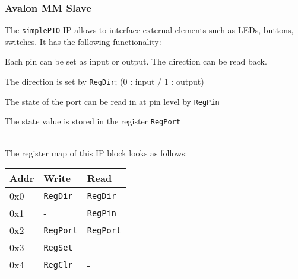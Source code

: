 		
		\subsubsection{Avalon MM Slave }
			The \texttt{simplePIO}-IP allows to interface external elements such as LEDs, buttons, switches. It has the following functionality:
			\begin{compactitem}
				\item Each pin can be set as input or output. The direction can be read back.
				\item The direction is set by \texttt{RegDir}; (0 : input / 1 : output)
				\item The state of the port can be read in at pin level by \texttt{RegPin}
				\item The state value is stored in the register \texttt{RegPort}
			\end{compactitem} \ \\
		
			The register map of this IP block looks as follows: \\
			\begin{tabular}{|p{0.1\textwidth}|p{}|p{}|}
				\hline
				\textbf{Addr} & \textbf{Write} & \textbf{Read} \\
				\hline
				0x0 & \texttt{RegDir} & \texttt{RegDir} \\ \hline
				0x1 & - & \texttt{RegPin} \\ \hline
				0x2 & \texttt{RegPort} & \texttt{RegPort} \\ \hline
				0x3 & \texttt{RegSet} & - \\ \hline
				0x4 & \texttt{RegClr} & - \\ \hline
			\end{tabular}
			\begin{multicols}{2}		
				
			\end{multicols}			
			
		